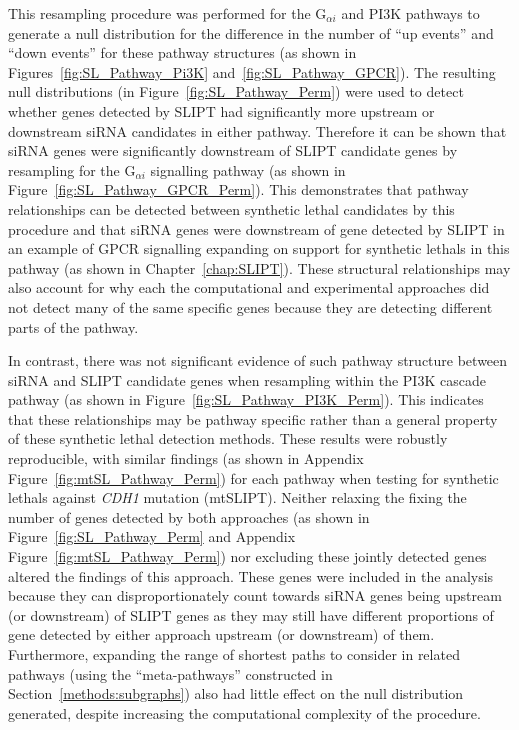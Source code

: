 This resampling procedure was performed for the G$_{\alpha i}$ and \gls{PI3K} \glspl{pathway} to generate a null distribution for the difference in the number of ``up events'' and ``down events'' for these \gls{pathway} structures (as shown in Figures~\ref{fig:SL_Pathway_Pi3K} and~\ref{fig:SL_Pathway_GPCR}). The resulting null distributions (in Figure~\ref{fig:SL_Pathway_Perm}) were used to detect whether genes detected by \gls{SLIPT} had significantly more upstream or downstream \gls{siRNA} candidates in either \gls{pathway}. Therefore it can be shown that \gls{siRNA} genes were significantly downstream of \gls{SLIPT} candidate genes by resampling for the G$_{\alpha i}$ signalling \gls{pathway} (as shown in Figure~\ref{fig:SL_Pathway_GPCR_Perm}). This demonstrates that \gls{pathway} relationships can be detected between \gls{synthetic lethal} candidates by this procedure and that \gls{siRNA} genes were downstream of gene detected by \gls{SLIPT} in an example of GPCR signalling expanding on support for \glspl{synthetic lethal} in this \gls{pathway} (as shown in Chapter~\ref{chap:SLIPT}). These structural relationships may also account for why each the computational and experimental approaches did not detect many of the same specific genes because they are detecting different parts of the \gls{pathway}.

In contrast, there was not significant evidence of such \gls{pathway} structure between \gls{siRNA} and \gls{SLIPT} candidate genes when resampling within the \gls{PI3K} cascade \gls{pathway} (as shown in Figure~\ref{fig:SL_Pathway_PI3K_Perm}). This indicates that these relationships may be \gls{pathway} specific rather than a general property of these \gls{synthetic lethal} detection methods. These results were robustly reproducible, with similar findings (as shown in Appendix Figure~\ref{fig:mtSL_Pathway_Perm}) for each \gls{pathway} when testing for \glspl{synthetic lethal} against \textit{CDH1} \gls{mutation} (\acrshort{mtSLIPT}). Neither relaxing the fixing the number of genes detected by both approaches (as shown in Figure~\ref{fig:SL_Pathway_Perm} and Appendix Figure~\ref{fig:mtSL_Pathway_Perm}) nor excluding these jointly detected genes altered the findings of this approach. These genes were included in the analysis because they can disproportionately count towards \gls{siRNA} genes being upstream (or downstream) of \gls{SLIPT} genes as they may still have different proportions of gene detected by either approach upstream (or downstream) of them. Furthermore, expanding the range of \glspl{shortest path} to consider  in related \glspl{pathway} (using the ``meta-\glspl{pathway}'' constructed in Section~\ref{methods:subgraphs}) also had little effect on the null distribution generated, despite increasing the computational complexity of the procedure.

